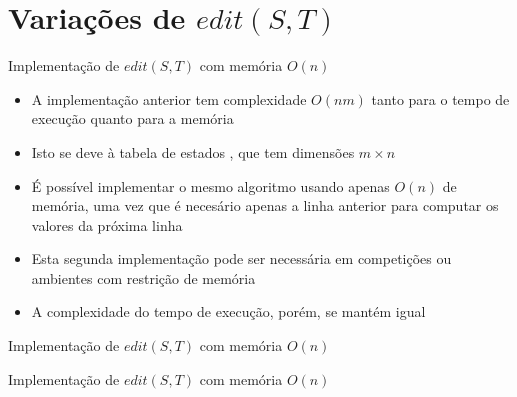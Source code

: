 \section{Variações de $edit(S, T)$}

\begin{frame}[fragile]{Implementação de $edit(S, T)$ com memória $O(n)$}

    \begin{itemize}
        \item A implementação anterior tem complexidade $O(nm)$ tanto para o tempo de execução
            quanto para a memória

        \item Isto se deve à tabela de estados , que tem dimensões $m \times n$

        \item  É possível implementar o mesmo algoritmo usando apenas $O(n)$ de memória, uma vez 
            que é necesário apenas a linha anterior para computar os valores da próxima linha

        \item Esta segunda implementação pode ser necessária em competições ou ambientes com 
            restrição de memória

        \item A complexidade do tempo de execução, porém, se mantém igual

    \end{itemize}

\end{frame}

\begin{frame}[fragile]{Implementação de $edit(S, T)$ com memória $O(n)$}
\end{frame}

\begin{frame}[fragile]{Implementação de $edit(S, T)$ com memória $O(n)$}
\end{frame}

